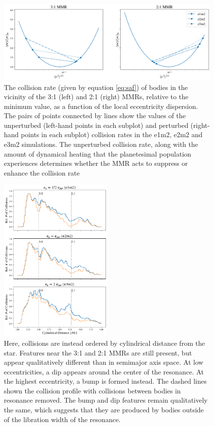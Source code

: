 \begin{figure}
\begin{center}
    \includegraphics[width=\textwidth]{figures/grind/gf_plot.png}
    \caption{The collision rate (given by equation \ref{eq:saf}) of bodies in the vicinity of the 3:1 (left) and 2:1 (right) MMRs, 
    relative to the minimum value, as a function of the local eccentricity dispersion. The pairs of points connected by lines show 
    the values of the unperturbed (left-hand points in each subplot) and perturbed (right-hand points in each subplot) collision 
    rates in the e1m2, e2m2 and e3m2 simulations. The unperturbed collision rate, along with the amount of dynamical heating 
    that the planetesimal population experiences determines whether the MMR acts to suppress or enhance the collision rate 
    \label{fig:gf}}
\end{center}
\end{figure}

\begin{figure}
\begin{center}
    \includegraphics[width=0.5\textwidth]{figures/grind/coll_hist_r.png}
    \caption{Here, collisions are instead ordered by cylindrical distance from the star. Features near the 3:1 and 2:1 MMRs are still 
    present, but appear qualitatively different than in semimajor axis space. At low eccentricities, a dip appears around the center 
    of the resonance. At the highest eccentricity, a bump is formed instead. The dashed lines shown the collision profile with 
    collisions between bodies in resonance removed. The bump and dip features remain qualitatively the same, which suggests 
    that they are produced by bodies outside of the libration width of the resonance.\label{fig:coll_hist_r}}
\end{center}
\end{figure}

